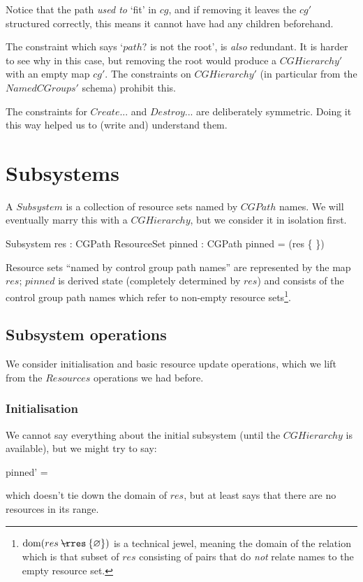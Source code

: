 \documentclass[a4paper,twoside,12pt]{article}
\begin{document}
Notice that the path \emph{used to} `fit' in $cg$, and if removing it leaves the $cg'$ structured correctly,
this means it cannot have had any children beforehand.

The constraint which says `$path?$ is not the root', is \emph{also} redundant.
It is harder to see why in this case, but removing the root would produce a $CGHierarchy'$ with an empty map $cg'$.
The constraints on $CGHierarchy'$ (in particular from the $NamedCGroups'$ schema) prohibit this.

The constraints for $Create$... and $Destroy$... are deliberately symmetric.
Doing it this way helped us to (write and) understand them.

\section{Subsystems}
\label{sec:ss}

A $Subsystem$ is a collection of resource sets named by $CGPath$ names. We will eventually marry
this with a $CGHierarchy$, but we consider it in isolation first.
\begin{schema}{Subsystem}
res : CGPath \ffun ResourceSet
\also
pinned : \finset CGPath
\where
pinned = \dom(res \nrres \{ \emptyset \})
\end{schema}
Resource sets ``named by control group path names'' are represented by the map $res$;
$pinned$ is derived state (completely determined by $res$) and consists of the control group path
names which refer to non-empty resource sets\footnote{$\dom(res \nrres \{ \emptyset \})$
is a technical jewel, meaning the domain
of the relation which is that subset of $res$ consisting of pairs that do \emph{not} relate names to the empty
resource set.}.

\subsection{Subsystem operations}
We consider initialisation
and basic resource update operations, which we lift from the $Resources$ operations we had before.

\subsubsection{Initialisation}
We cannot say everything about the initial subsystem (until the $CGHierarchy$ is available), but we might try to
say:
\begin{zed}
pinned' = \emptyset
\end{zed}
which doesn't tie down the domain of $res$, but at least says that there are no resources in its range.
\end{document}
